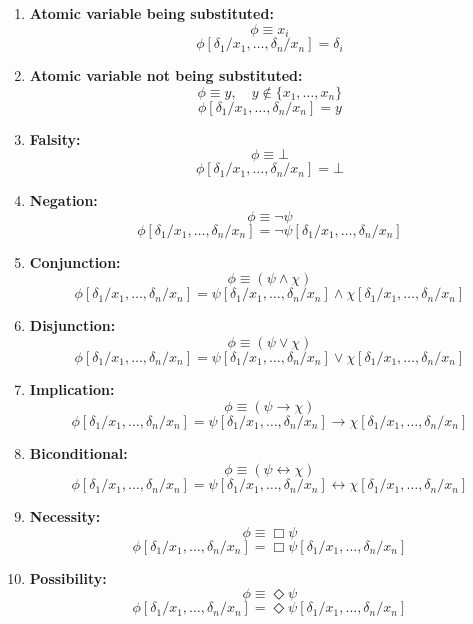 \documentclass[12pt,a4paper,openany]{article}
\begin{document}
\begin{enumerate}
    \item \textbf{Atomic variable being substituted:}
    $$\phi \equiv x_i$$
    $$\phi[\delta_1/x_1, \dots, \delta_n/x_n] = \delta_i$$
    
    \item \textbf{Atomic variable not being substituted:}
    $$\phi \equiv y, \quad y \notin \{x_1, \dots, x_n\}$$
    $$\phi[\delta_1/x_1, \dots, \delta_n/x_n] = y$$
    
    \item \textbf{Falsity:}
    $$\phi \equiv \bot$$
    $$\phi[\delta_1/x_1, \dots, \delta_n/x_n] = \bot$$
    
    \item \textbf{Negation:}
    $$\phi \equiv \neg \psi$$
    $$\phi[\delta_1/x_1, \dots, \delta_n/x_n] = \neg \psi[\delta_1/x_1, \dots, \delta_n/x_n]$$
    
    \item \textbf{Conjunction:}
    $$\phi \equiv (\psi \land \chi)$$
    $$\phi[\delta_1/x_1, \dots, \delta_n/x_n] = \psi[\delta_1/x_1, \dots, \delta_n/x_n] \land \chi[\delta_1/x_1, \dots, \delta_n/x_n]$$
    
    \item \textbf{Disjunction:}
    $$\phi \equiv (\psi \lor \chi)$$
    $$\phi[\delta_1/x_1, \dots, \delta_n/x_n] = \psi[\delta_1/x_1, \dots, \delta_n/x_n] \lor \chi[\delta_1/x_1, \dots, \delta_n/x_n]$$
    
    \item \textbf{Implication:}
    $$\phi \equiv (\psi \to \chi)$$
    $$\phi[\delta_1/x_1, \dots, \delta_n/x_n] = \psi[\delta_1/x_1, \dots, \delta_n/x_n] \to \chi[\delta_1/x_1, \dots, \delta_n/x_n]$$
    
    \item \textbf{Biconditional:}
    $$\phi \equiv (\psi \leftrightarrow \chi)$$
    $$\phi[\delta_1/x_1, \dots, \delta_n/x_n] = \psi[\delta_1/x_1, \dots, \delta_n/x_n] \leftrightarrow \chi[\delta_1/x_1, \dots, \delta_n/x_n]$$
    
    \item \textbf{Necessity:}
    $$\phi \equiv \Box \psi$$
    $$\phi[\delta_1/x_1, \dots, \delta_n/x_n] = \Box \psi[\delta_1/x_1, \dots, \delta_n/x_n]$$
    
    \item \textbf{Possibility:}
    $$\phi \equiv \Diamond \psi$$
    $$\phi[\delta_1/x_1, \dots, \delta_n/x_n] = \Diamond \psi[\delta_1/x_1, \dots, \delta_n/x_n]$$
\end{enumerate}
\end{document}
